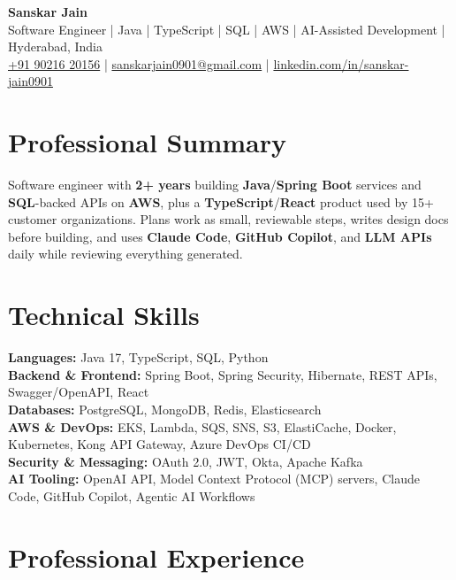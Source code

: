 \documentclass[a4paper,10pt]{article}
\begin{document}
\begin{center}
    {\LARGE \textbf{Sanskar Jain}} \\
    \vspace{2pt}
    Software Engineer \;|\; Java \;|\; TypeScript \;|\; SQL \;|\; AWS \;|\; AI-Assisted Development \;|\; Hyderabad, India \\
    \vspace{2pt}
    \href{tel:+919021620156}{+91 90216 20156} \;|\;
    \href{mailto:sanskarjain0901@gmail.com}{sanskarjain0901@gmail.com} \;|\;
    \href{https://www.linkedin.com/in/sanskar-jain0901/}{linkedin.com/in/sanskar-jain0901}
\end{center}

\section*{Professional Summary}
Software engineer with \textbf{2+ years} building \textbf{Java}/\textbf{Spring Boot} services and \textbf{SQL}-backed APIs on \textbf{AWS}, plus a \textbf{TypeScript}/\textbf{React} product used by 15+ customer organizations. Plans work as small, reviewable steps, writes design docs before building, and uses \textbf{Claude Code}, \textbf{GitHub Copilot}, and \textbf{LLM APIs} daily while reviewing everything generated.

\section*{Technical Skills}
\begin{sloppypar}
\noindent
\textbf{Languages:} Java 17, TypeScript, SQL, Python \\
\textbf{Backend \& Frontend:} Spring Boot, Spring Security, Hibernate, REST APIs, Swagger/OpenAPI, React \\
\textbf{Databases:} PostgreSQL, MongoDB, Redis, Elasticsearch \\
\textbf{AWS \& DevOps:} EKS, Lambda, SQS, SNS, S3, ElastiCache, Docker, Kubernetes, Kong API Gateway, Azure DevOps CI/CD \\
\textbf{Security \& Messaging:} OAuth 2.0, JWT, Okta, Apache Kafka \\
\textbf{AI Tooling:} OpenAI API, Model Context Protocol (MCP) servers, Claude Code, GitHub Copilot, Agentic AI Workflows
\end{sloppypar}

\section*{Professional Experience}
\end{document}
